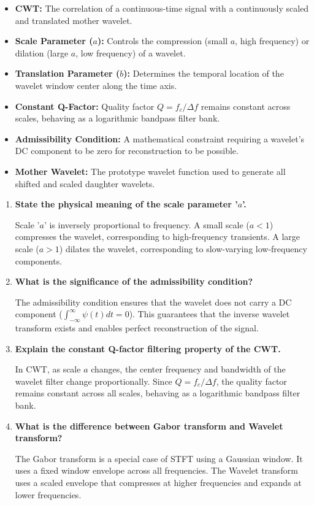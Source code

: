 \documentclass[12pt,a4paper]{article}
\newcommand{\Q}[1]{\textbf{#1}\par\noindent\ignorespaces}
\begin{document}
\begin{tcolorbox}[defbox, title={\textbf{One-Line Definitions}}]
\begin{itemize}[leftmargin=*, itemsep=3.5pt]
  \item \textbf{CWT:} The correlation of a continuous-time signal with a continuously scaled and translated mother wavelet.
  \item \textbf{Scale Parameter ($a$):} Controls the compression (small $a$, high frequency) or dilation (large $a$, low frequency) of a wavelet.
  \item \textbf{Translation Parameter ($b$):} Determines the temporal location of the wavelet window center along the time axis.
  \item \textbf{Constant Q-Factor:} Quality factor $Q = f_c/\Delta f$ remains constant across scales, behaving as a logarithmic bandpass filter bank.
  \item \textbf{Admissibility Condition:} A mathematical constraint requiring a wavelet's DC component to be zero for reconstruction to be possible.
  \item \textbf{Mother Wavelet:} The prototype wavelet function used to generate all shifted and scaled daughter wavelets.
\end{itemize}
\end{tcolorbox}

\begin{tcolorbox}[exambox, title={\textbf{Frequently Asked / Viva Questions}}]
\begin{enumerate}[topsep=0pt, label=\textbf{Q\arabic*.}, itemsep=5pt]
  \item \Q{State the physical meaning of the scale parameter '$a$'.}
        Scale '$a$' is inversely proportional to frequency. A small scale ($a < 1$) compresses the wavelet, corresponding to high-frequency transients. A large scale ($a > 1$) dilates the wavelet, corresponding to slow-varying low-frequency components.

  \item \Q{What is the significance of the admissibility condition?}
        The admissibility condition ensures that the wavelet does not carry a DC component ($\int_{-\infty}^{\infty} \psi(t) dt = 0$). This guarantees that the inverse wavelet transform exists and enables perfect reconstruction of the signal.

  \item \Q{Explain the constant Q-factor filtering property of the CWT.}
        In CWT, as scale $a$ changes, the center frequency and bandwidth of the wavelet filter change proportionally. Since $Q = f_c/\Delta f$, the quality factor remains constant across all scales, behaving as a logarithmic bandpass filter bank.

  \item \Q{What is the difference between Gabor transform and Wavelet transform?}
        The Gabor transform is a special case of STFT using a Gaussian window. It uses a fixed window envelope across all frequencies. The Wavelet transform uses a scaled envelope that compresses at higher frequencies and expands at lower frequencies.
\end{enumerate}
\end{tcolorbox}
\end{document}

